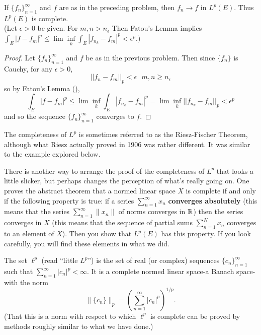 \begin{pblm}%
	If $\{f_n\}_{n=1}^\infty$ and $f$ are as in the preceding problem, then $f_n \rightarrow f$ in 
	$L^p(E)$. Thus $L^p(E)$ is complete.\\
	{\scriptsize{(Let $\epsilon > 0$ be given. For $m,n > n_\epsilon$ Then Fatou's Lemma implies 
	$ \int_E|f-f_m|^p \le \lim\inf\limits_{k}\int_E|f_{n_k} - f_m|^p < \epsilon^p.) $ }}
\begin{proof}
	Let $\{f_n\}_{n=1}^\infty$ and $f$ be as in the previous problem. Then since $\{f_n\}$ is 
	Cauchy, for any $\epsilon > 0$, 
	\begin{equation*}
		||f_n - f_m||_p < \epsilon ~~~ m, n \ge n_\epsilon
	\end{equation*}
	so by Fatou's Lemma (), 
	\begin{equation*}
		\int_E |f - f_m|^p \le \lim\inf\limits_{k}\int_E|f_{n_k} - f_m|^p 
				= \lim\inf\limits_{k}||f_{n_k} - f_m||_p < \epsilon^p
	\end{equation*}
	and so the sequence $\{f_n\}_{n=1}^\infty$ converges to $f$. 
\end{proof}
\end{pblm}

\begin{rmk}%
	The completeness of $L^p$ is sometimes referred to as the Riesz-Fischer Theorem, although 
	what Riesz actually proved in 1906 was rather different. It was similar to the example 
	explored below. 
\end{rmk}

\begin{rmk}%
	There is another way to arrange the proof of the completeness of $L^p$ that looks a little 
	slicker, but perhaps changes the perception of what's really going on. One proves the abstract 
	theorem that a normed linear space $X$ is complete if and only if the following property is 
	true: if a series $\sum\limits_{n=1}^\infty x_n$ \textbf{converges absolutely} (this means 
	that the series $\sum\limits_{n=1}^\infty \|x_n\|$ of norms converges in $\mathbb{R}$) then the series 
	converges in $X$ (this means that the sequence of partial sums $\sum\limits_{n=1}^N x_n$ 
	converges to an element of $X$). Then you show that $L^p(E)$ has this property. If you look 
	carefully, you will find these elements in what we did.
\end{rmk}

\begin{defn}%
	The set $\ell^p$ (read ``little $L^p$'') is the set of real (or complex) sequences $\{c_n\}_{n=1}^\infty$ 
	such that $\sum\limits_{n=1}^\infty |c_n|^p < \infty$. It is a complete normed linear space-a 
	Banach space-with the norm 
	\begin{equation*}
		\|\{c_n\}\|_p = \left(\sum\limits_{n=1}^\infty |c_n|^p\right)^{1/p}. 
	\end{equation*}
	(That this is a norm with respect to which $\ell^p$ is complete can be proved by methods 
	roughly similar to what we have done.)
\end{defn}

